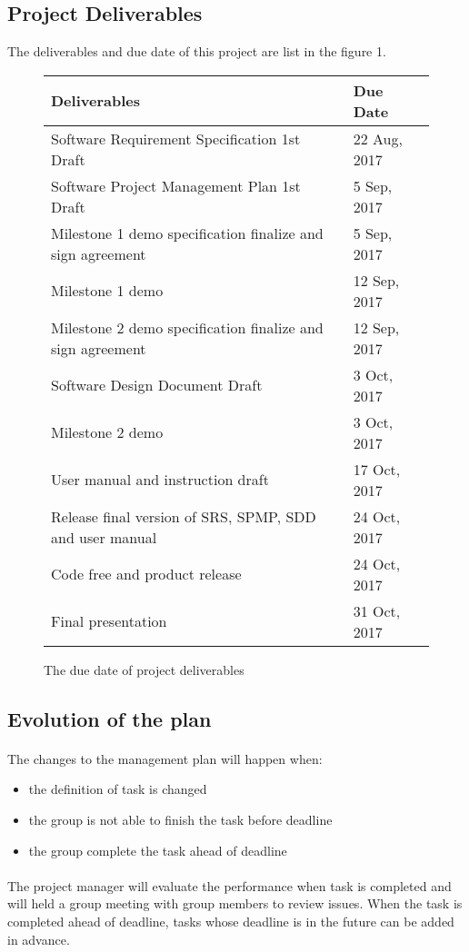 \subsection{Project Deliverables}
The deliverables and due date of this project are list in the figure 1.
\begin{figure}
	\centering
	\begin{tabular}{|p{8cm}|p{3cm}|}
		
		\hline 
		\textbf{Deliverables} &\textbf{Due Date} \\ 
		\hline 
		Software Requirement Specification 1st Draft & 22 Aug, 2017\\ 
		\hline 
		Software Project Management Plan 1st Draft & 5 Sep, 2017  \\ 
		\hline 		
		Milestone 1 demo specification finalize and sign agreement & 5 Sep, 2017 \\ 
		\hline 
		Milestone 1 demo & 12 Sep, 2017\\ 
		\hline 
		Milestone 2 demo specification finalize and sign agreement & 12 Sep, 2017 \\ 
		\hline 
		Software Design Document Draft & 3 Oct, 2017\\ 
		\hline 
		Milestone 2 demo & 3 Oct, 2017\\ 
		\hline 		
		User manual and instruction draft & 17 Oct, 2017\\ 
		\hline 
		Release final version of SRS, SPMP, SDD and user manual & 24 Oct, 2017\\ 
		\hline 
		Code free and product release & 24 Oct, 2017\\ 
		\hline 
		Final presentation & 31 Oct, 2017\\
		\hline
	\end{tabular} 
	\caption{The due date of project deliverables}
	\label{fig:tab Os Requirements}			
\end{figure}

\subsection{Evolution of the plan}
\paragraph{}
The changes to the management plan will happen when:
\begin{itemize}
	\item the definition of task is changed
	\item the group is not able to finish the task before deadline
	\item the group complete the task ahead of deadline		
\end{itemize}
\paragraph{}
The project manager will evaluate the performance when task is completed and will held a group meeting with group members to review issues. When the task is completed ahead of deadline, tasks whose deadline is in the future can be added in advance.
